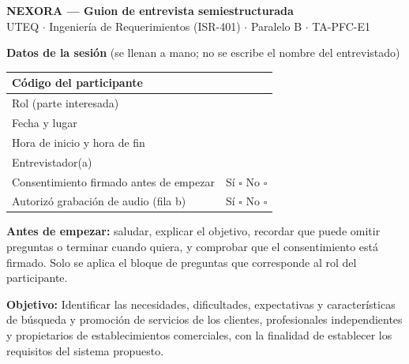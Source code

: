 \documentclass[11pt,a4paper]{article}
\begin{document}
\begin{center}
{\large\textbf{NEXORA --- Guion de entrevista semiestructurada}}\\[2pt]
{\small UTEQ $\cdot$ Ingenier\'ia de Requerimientos (ISR-401) $\cdot$ Paralelo B $\cdot$ TA-PFC-E1}
\end{center}

\textbf{Datos de la sesi\'on} (se llenan a mano; no se escribe el nombre del entrevistado)

\begin{tabularx}{\textwidth}{|L{5.2cm}|X|}
\hline
C\'odigo del participante & \\ \hline
Rol (parte interesada) & \\ \hline
Fecha y lugar & \\ \hline
Hora de inicio y hora de fin & \\ \hline
Entrevistador(a) & \\ \hline
Consentimiento firmado antes de empezar & \quad S\'i $\square$ \qquad No $\square$ \\ \hline
Autoriz\'o grabaci\'on de audio (fila b) & \quad S\'i $\square$ \qquad No $\square$ \\ \hline
\end{tabularx}

\textbf{Antes de empezar:} saludar, explicar el objetivo, recordar que puede omitir preguntas o terminar cuando quiera, y comprobar que el consentimiento est\'a firmado. Solo se aplica el bloque de preguntas que corresponde al rol del participante.


\textbf{Objetivo:} Identificar las necesidades, dificultades, expectativas y caracter\'isticas de b\'usqueda y promoci\'on de servicios de los clientes, profesionales independientes y propietarios de establecimientos comerciales, con la finalidad de establecer los requisitos del sistema propuesto.
\end{document}
